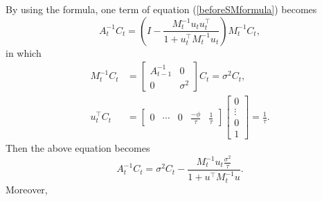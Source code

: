 By using the formula, one term of equation (\ref{beforeSMformula}) becomes 
\begin{equation}
A_{t}^{-1}C_{t} = \left( I - \frac{M_{t}^{-1}u_{t}u_{t}^\top }{1+u_{t}^\top M_{t}^{-1} u_{t}} \right)M_{t}^{-1}C_{t},
\end{equation}
in which
\begin{align*}
M_{t}^{-1}C_{t}    &=\left[ \begin{array}{cc} A_{t-1}^{-1} & 0 \\ 0 & \sigma^2 \end{array} \right]C_{t}=\sigma^2 C_{t},\\
u_{t}^\top C_{t} & = \left[ \begin{array}{ccccc} 0 & \cdots & 0 &\frac{-\phi}{\tau} & \frac{1}{\tau} \end{array} \right] \left[ \begin{array}{c} 0 \\ \vdots \\ 0\\ 1 \end{array} \right]= \frac{1}{\tau}.
\end{align*}
Then the above equation becomes
\begin{equation}
A_{t}^{-1}C_{t} = \sigma^2 C_{t}-\frac{M_{t}^{-1} u_{t} \frac{\sigma^2}{\tau}}{1+u^\top M_{t}^{-1} u}.
\end{equation}
Moreover,
